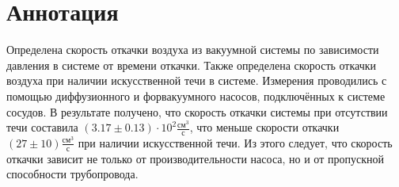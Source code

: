 \section*{Аннотация}

Определена скорость откачки воздуха из вакуумной системы по зависимости давления в системе от времени откачки. Также определена скорость откачки воздуха при наличии искусственной течи в системе. Измерения проводились с помощью диффузионного и форвакуумного насосов, подключённых к системе сосудов. В результате получено, что скорость откачки системы при отсутствии течи составила $(3.17\pm0.13)\cdot 10^2\frac{\text{см}^3}{\text{с}}$, что меньше скорости откачки $(27\pm10)\frac{\text{см}^3}{\text{с}}$ при наличии искусственной течи. Из этого следует, что скорость откачки зависит не только от производительности насоса, но и от пропускной способности трубопровода.
